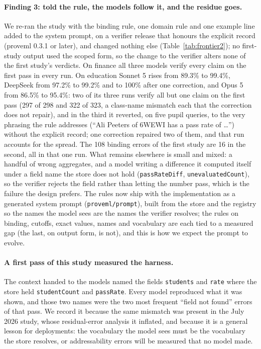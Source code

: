 \documentclass[11pt,a4paper]{article}
\begin{document}
\paragraph{Finding 3: told the rule, the models follow it, and the residue goes.} We re-ran the study with the binding rule, one domain rule and one example line added to the system prompt, on a verifier release that honours the explicit record (proveml 0.3.1 or later), and changed nothing else (Table~\ref{tab:frontier2}); no first-study output used the scoped form, so the change to the verifier alters none of the first study's verdicts. On finance all three models verify every claim on the first pass in every run. On education Sonnet 5 rises from 89.3\% to 99.4\%, DeepSeek from 97.2\% to 99.2\% and to 100\% after one correction, and Opus 5 from 86.5\% to 95.4\%: two of its three runs verify all but one claim on the first pass (297 of 298 and 322 of 323, a class-name mismatch each that the correction does not repair), and in the third it reverted, on five pupil queries, to the very phrasing the rule addresses (``Ali Peeters of 6WEWI has a pass rate of \ldots'') without the explicit record; one correction repaired two of them, and that run accounts for the spread. The 108 binding errors of the first study are 16 in the second, all in that one run. What remains elsewhere is small and mixed: a handful of wrong aggregates, and a model writing a difference it computed itself under a field name the store does not hold (\texttt{passRateDiff}, \texttt{unevaluatedCount}), so the verifier rejects the field rather than letting the number pass, which is the failure the design prefers. The rules now ship with the implementation as a generated system prompt (\texttt{proveml/prompt}), built from the store and the registry so the names the model sees are the names the verifier resolves; the rules on binding, cutoffs, exact values, names and vocabulary are each tied to a measured gap (the last, on output form, is not), and this is how we expect the prompt to evolve.

\paragraph{A first pass of this study measured the harness.} The context handed to the models named the fields \texttt{students} and \texttt{rate} where the store held \texttt{studentCount} and \texttt{passRate}. Every model reproduced what it was shown, and those two names were the two most frequent ``field not found'' errors of that pass. We record it because the same mismatch was present in the July 2026 study, whose residual-error analysis it inflated, and because it is a general lesson for deployments: the vocabulary the model sees must be the vocabulary the store resolves, or addressability errors will be measured that no model made.
\end{document}
